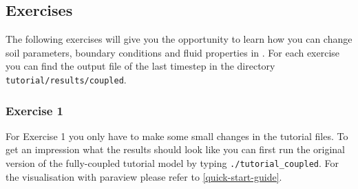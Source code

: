 \subsection{Exercises}
\label{tutorial-coupled:exercises}
The following exercises will give you the opportunity to learn how you
can change soil parameters, boundary conditions and fluid properties
in \Dumux. For each exercise you can find the output file of the last
timestep in the directory \texttt{tutorial/results/coupled}.

\subsubsection{Exercise 1}
\renewcommand{\labelenumi}{\alph{enumi})} For Exercise 1 you only have
to make some small changes in the tutorial files.  To get an
impression what the results should look like you can first run the
original version of the fully-coupled tutorial model by typing
\texttt{./tutorial\_coupled}. For the visualisation with paraview
please refer to \ref{quick-start-guide}.
